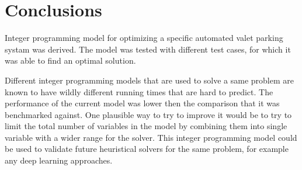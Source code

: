 \section{Conclusions}

Integer programming model for optimizing a specific automated valet parking systam was derived. The model was tested with different test cases, 
for which it was able to find an optimal solution. 

Different integer programming models that are used to solve a same problem are known to have wildly different running times that are hard to predict.
The performance of the current model was lower then the comparison that it was benchmarked against. One plausible way to try to improve it would be to try to 
limit the total number of variables in the model by combining them into single variable with a wider range for the solver. 
This integer programming model could be used to validate future heuristical solvers for the same problem, for example any deep learning approaches.  
